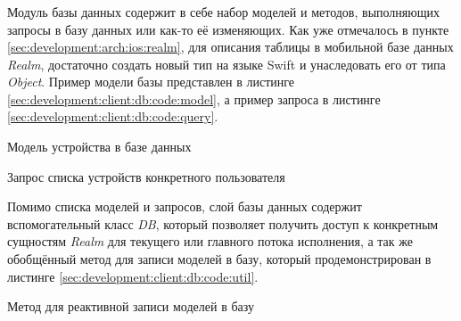 \subsubsection{}
\label{sec:development:client:db}

Модуль базы данных содержит в себе набор моделей и методов, выполняющих запросы в базу данных или как-то её изменяющих. 
Как уже отмечалось в пункте \ref{sec:development:arch:ios:realm}, для описания таблицы в мобильной базе данных \textit{Realm}, достаточно создать новый тип на языке Swift и унаследовать его от типа \textit{Object}. Пример модели базы представлен в листинге \ref{sec:development:client:db:code:model}, а пример запроса в листинге \ref{sec:development:client:db:code:query}.

\begin{code}
	
   \caption{Модель устройства в базе данных}
   \label{sec:development:client:db:code:model}
\end{code}

\begin{code}
	
   \caption{Запрос списка устройств конкретного пользователя}
   \label{sec:development:client:db:code:query}
\end{code}

Помимо списка моделей и запросов, слой базы данных содержит вспомогательный класс \textit{DB}, который позволяет получить доступ к конкретным сущностям \textit{Realm} для текущего или главного потока исполнения, а так же обобщённый метод для записи моделей в базу, который продемонстрирован в листинге \ref{sec:development:client:db:code:util}.

\begin{code}
	
   \caption{Метод для реактивной записи моделей в базу}
   \label{sec:development:client:db:code:util}
\end{code}